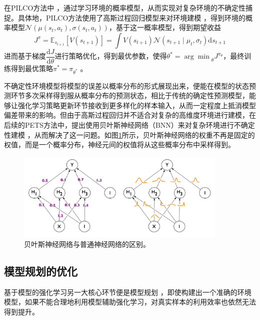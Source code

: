在PILCO方法中 \cite{deisenroth2011pilco}，通过学习环境的概率模型，从而实现对复杂环境的不确定性捕捉。具体地，PILCO方法使用了高斯过程回归模型来对环境建模 \cite{quinonero2005unifying}，得到环境的概率模型$\mathcal{N}\left(\mu(s_t,a_t), \sigma(s_t,a_t)\right)$，基于这一概率模型，得到期望收益
\begin{equation}
    J^\pi=\mathbb{E}_{s_{t+1}}\left[V\left(s_{t+1}\right)\right]=\int V\left(s_{t+1}\right) \mathcal{N}\left(s_{t+1} \mid \mu_t, \sigma_t\right) \mathrm{d} s_{t+1}
\end{equation}
进而基于梯度$\dfrac{\mathrm{d}J}{\mathrm{d}\theta}$进行策略优化，得到最优参数，使得$\theta^* = {\arg\min}_\theta J^{\pi_\theta}$，最终训练得到最优策略$\pi^*=\pi_{\theta^*}$ 。\cite{peters2006policy}

不确定性环境模型将模型的误差以概率分布的形式展现出来，便能在模型的状态预测环节多次采样得到服从概率分布的预测状态，相比于传统的确定性预测模型，能够让强化学习策略更新环节接收到更多样化的样本输入，从而一定程度上抵消模型偏差带来的影响。但由于高斯过程回归并不适合对复杂的高维度环境进行建模，在后续的PETS方法中，提出使用贝叶斯神经网络（BNN）来对复杂环境进行不确定性建模 \cite{Blundell2015WeightNetworks}，从而解决了这一问题。如图\ref{fig:BNN}所示，贝叶斯神经网络的权重不再是固定的权值，而是一个概率分布，神经元间的权值将从这些概率分布中采样得到。

\begin{figure}[tbh]
\centering
\includegraphics[width=0.9\textwidth]{figures/BNN.png}
\caption{贝叶斯神经网络与普通神经网络的区别。}
\label{fig:BNN}
\end{figure}

\subsection{模型规划的优化}

基于模型的强化学习另一大核心环节便是模型规划 \cite{walsh2010integrating}，即使构建出一个准确的环境模型，如果不能合理地利用模型辅助强化学习，对真实样本的利用效率也依然无法得到提升。

